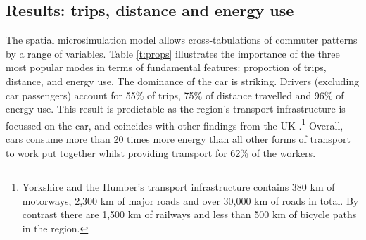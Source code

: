\subsection{Results: trips, distance and energy use}
\label{results8}
%

The spatial microsimulation model allows
cross-tabulations of commuter patterns by a range of variables.
Table \ref{t:props} illustrates the importance of
the three most popular modes in terms of fundamental features: proportion of
trips,
distance, and energy use.
The dominance of the car is striking. Drivers
(excluding car passengers) account for
55\% of trips, 75\% of distance travelled and
96\% of energy use. This result is predictable as the region's
transport infrastructure is focussed on the
car, and coincides with other findings from the UK
\citep{Brand2013}.\footnote{Yorkshire
and the Humber's transport infrastructure contains 380 km
of motorways, 2,300 km of major roads and over 30,000 km of roads in total.
By contrast there are 1,500 km of railways and less than 500 km of
bicycle paths in the region.}
Overall, cars consume more than 20 times more energy than all other
forms of transport to work put together whilst providing transport for
62\% of the workers.

